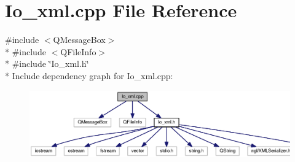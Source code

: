 \section{Io\-\_\-xml.\-cpp File Reference}
\label{_io__xml_8cpp}
{\ttfamily \#include $<$Q\-Message\-Box$>$}\\*
{\ttfamily \#include $<$Q\-File\-Info$>$}\\*
{\ttfamily \#include \char`\"{}Io\-\_\-xml.\-h\char`\"{}}\\*
Include dependency graph for Io\-\_\-xml.\-cpp\-:\nopagebreak
\begin{figure}[H]
\begin{center}
\leavevmode
\includegraphics[width=350pt]{_io__xml_8cpp__incl}
\end{center}
\end{figure}
